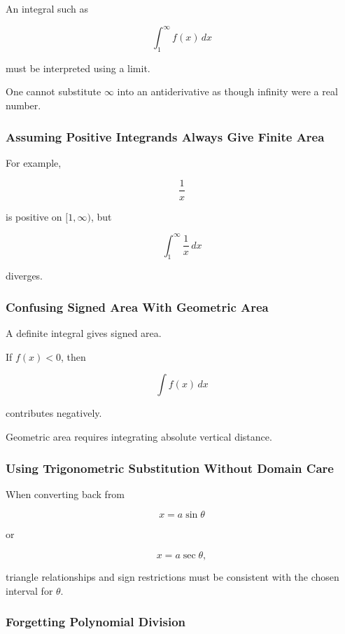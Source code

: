 An integral such as

\[
\int_1^\infty f(x)\,dx
\]

must be interpreted using a limit.

One cannot substitute \(\infty\) into an antiderivative as though infinity
were a real number.

\subsubsection{Assuming Positive Integrands Always Give Finite Area}

For example,

\[
\frac1x
\]

is positive on \([1,\infty)\), but

\[
\boxed{
\int_1^\infty
\frac1x
\,dx
}
\]

diverges.

\subsubsection{Confusing Signed Area With Geometric Area}

A definite integral gives signed area.

If \(f(x)<0\), then

\[
\int f(x)\,dx
\]

contributes negatively.

Geometric area requires integrating absolute vertical distance.

\subsubsection{Using Trigonometric Substitution Without Domain Care}

When converting back from

\[
x=a\sin\theta
\]

or

\[
x=a\sec\theta,
\]

triangle relationships and sign restrictions must be consistent with the
chosen interval for \(\theta\).

\subsubsection{Forgetting Polynomial Division}

